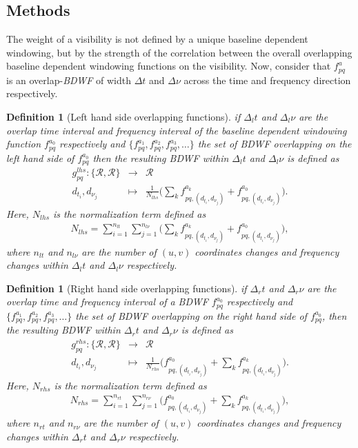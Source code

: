 \documentclass[useAMS,usenatbib]{mn2e}
\newtheorem{definition}[theorem]{Definition}
\begin{document}
\subsection{Methods}
The weight of a visibility is not defined by a unique baseline dependent windowing, but by the strength of the correlation between the 
overall  overlapping baseline dependent windowing functions on the visibility. Now, consider that $f^{a}_{pq}$ is an overlap-\textit{BDWF} 
of width  $\Delta t$ and $\Delta \nu$ across the time and frequency direction respectively.
\begin{definition}[Left hand side overlapping functions]
\label{def:4}
if $\Delta_l t$ and $\Delta_l \nu$ are the overlap time interval and frequency interval of the baseline dependent windowing function  
$f_{pq}^{a_0}$ respectively  and $\Big\{f_{pq}^{a_1},f_{pq}^{a_2},f_{pq}^{a_3}, \dots \Big\}$ the set of \textit{BDWF} overlapping  on the 
\textit{left hand side} of $f_{pq}^{a_0}$ then the resulting \textit{BDWF} within $\Delta_l t$ and $\Delta_l \nu$ is defined as
\begin{eqnarray*}
 g^{lhs}_{pq}: \{\mathbf{\mathcal{R}},\mathbf{\mathcal{R}}\} &\rightarrow& \mathbf{\mathcal{R}}\\
                   d_{t_i},d_{\nu_j} &\mapsto& \frac{1}{N_{lhs}}\Bigg(\sum_{k}f_{pq,(d_{t_i},d_{\nu_j})}^{a_k} 
+ f_{pq,(d_{t_i},d_{\nu_j})}^{a_0}\Bigg).
\end{eqnarray*}
Here, $N_{lhs}$ is the normalization term defined as
\begin{eqnarray*}
N_{lhs}=\sum_{i=1}^{n_{lt}}\sum_{j=1}^{n_{l\nu}}\Bigg(\sum_{k}f_{pq,(d_{t_i},d_{\nu_j})}^{a_k} + f_{pq,(d_{t_i},d_{\nu_j})}^{a_0} \Bigg),
\end{eqnarray*}
where $n_{lt}$ and $n_{l\nu}$ are the number of $(u,v)$ coordinates changes and frequency changes  within $\Delta_l t$ and $\Delta_l \nu$ 
respectively.
\end{definition}
\begin{definition}[Right hand side overlapping functions]
 \label{def:4}
 if $\Delta_r t$ and $\Delta_r \nu$ are the overlap time and frequency interval of a \textit{BDWF} $f_{pq}^{a_0}$ 
respectively and  $\Big\{f_{pq}^{a_1},f_{pq}^{a_2},f_{pq}^{a_3}, \dots \Big\}$ the set of \textit{BDWF} overlapping on the \textit{right 
hand side} of $f_{pq}^{a_0}$, then the 
resulting \textit{BDWF} within $\Delta_r t$ and $\Delta_r \nu$ is defined as
\begin{eqnarray*}
 g^{rhs}_{pq}: \{\mathbf{\mathcal{R}},\mathbf{\mathcal{R}}\} &\rightarrow& \mathbf{\mathcal{R}}\\
                   d_{t_i},d_{\nu_j} &\mapsto& 
\frac{1}{N_{rhs}}\Bigg (f_{pq,(d_{t_i},d_{\nu_j})}^{a_0}+\sum_{k}f_{pq,(d_{t_i},d_{\nu_j})}^{a_k}\Bigg ).
\end{eqnarray*}
Here, $N_{rhs}$ is the normalization term defined as
\begin{eqnarray*}
N_{rhs}=\sum_{i=1}^{n_{rt}}\sum_{j=1}^{n_{r\nu}}\Bigg(f_{pq,(d_{t_i},d_{\nu_j})}^{a_0} + \sum_{k}f_{pq,(d_{t_i},d_{\nu_j})}^{a_k}\Bigg),
\end{eqnarray*}
where $n_{rt}$ and $n_{r\nu}$ are the number of $(u,v)$ coordinates changes and frequency changes  within $\Delta_r t$ and $\Delta_r \nu$ 
respectively.
\end{definition}
\end{document}
